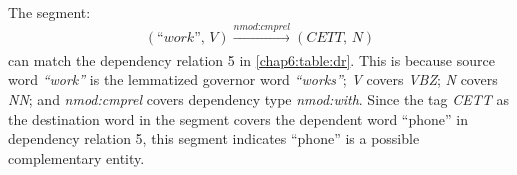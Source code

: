 \begin{table}
\centering
{}
\caption{Rules of matching attributes of dependency segments and dependency relations}
\label{chap6:table:match}
\end{table}

The segment:  
\begin{equation}
\label{eq:l11}
(\textit{``work'', V})\xrightarrow[]{\textit{nmod:cmprel}}(\textit{CETT, N})
\end{equation}
can match the dependency relation 5 in \ref{chap6:table:dr}. This is because source word \textit{``work''} is the lemmatized governor word \textit{``works''}; \textit{V} covers \textit{VBZ}; \textit{N} covers \textit{NN}; and \textit{nmod:cmprel} covers dependency type \textit{nmod:with}. Since the tag \textit{CETT} as the destination word in the segment covers the dependent word ``phone'' in dependency relation 5, this segment indicates ``phone'' is a possible complementary entity.

